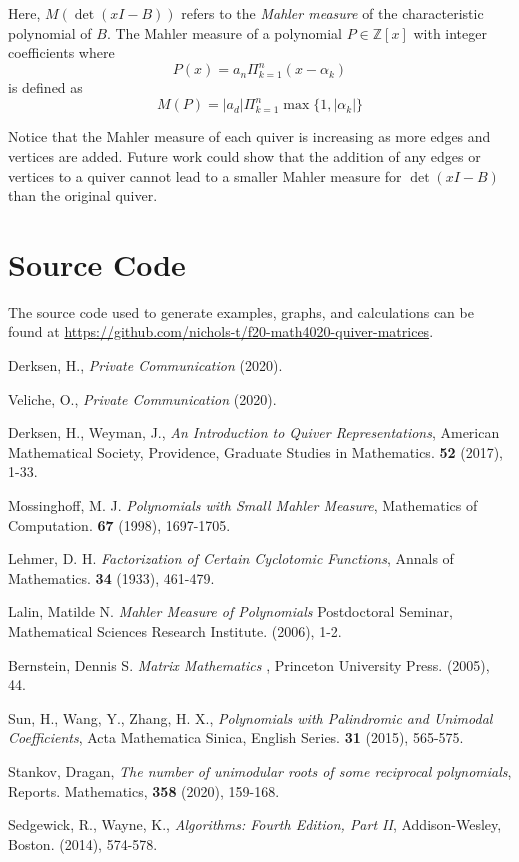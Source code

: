 \documentclass{amsart}
\theoremstyle{theorem}
\theoremstyle{theorem*}
\theoremstyle{definition}
\begin{document}
Here, $M(\det(xI - B))$ refers to the \textit{Mahler measure} \cite{m} of the
characteristic polynomial of $B$.
The Mahler measure of a polynomial $P \in \mathbb{Z}[x]$
with integer coefficients
where $$P(x) = a_n \Pi_{k=1}^{n} (x - \alpha_k)$$
is defined as
$$M(P) = |a_d|\Pi_{k=1}^{n}\max\{1, |\alpha_k|\}$$

Notice that the Mahler measure of each quiver is increasing as more edges and vertices
are added. Future work could show that the addition of any edges or
vertices to a quiver cannot lead to a smaller
Mahler measure for $\det(xI - B)$ than the original quiver.

\appendix
\section{Source Code}

The source code used to generate examples, graphs, and calculations can
be found at
\textcolor{blue}{\url{https://github.com/nichols-t/f20-math4020-quiver-matrices}}.
\begin{thebibliography}{99}

     Derksen, H., {\em Private Communication} (2020).

     Veliche, O., {\em Private Communication} (2020).

     Derksen, H., Weyman, J., {\em An Introduction to Quiver
            Representations\/}, American Mathematical Society, Providence,
    Graduate Studies in Mathematics. {\bf 52} (2017), 1-33.

     Mossinghoff, M. J. {\em Polynomials with Small Mahler
            Measure\/}, Mathematics of Computation. {\bf 67} (1998), 1697-1705.

     Lehmer, D. H. {\em Factorization of Certain Cyclotomic
            Functions\/}, Annals of Mathematics. {\bf 34} (1933), 461-479.

     Lalin, Matilde N. {\em Mahler Measure of Polynomials\/}
    Postdoctoral Seminar, Mathematical Sciences Research Institute. (2006), 1-2.

     Bernstein, Dennis S. {\em Matrix Mathematics \/},
    Princeton University Press. (2005), 44.

     Sun, H., Wang, Y., Zhang, H. X., {\em Polynomials with
            Palindromic and Unimodal Coefficients}, Acta Mathematica Sinica, English
    Series. {\bf 31} (2015), 565-575.

     Stankov, Dragan, {\em The number of unimodular roots of some
            reciprocal polynomials}, Reports. Mathematics, {\bf 358} (2020), 159-168.

     Sedgewick, R., Wayne, K., {\em Algorithms: Fourth Edition,
            Part II\/}, Addison-Wesley, Boston. (2014), 574-578.

\end{thebibliography}
\end{document}
